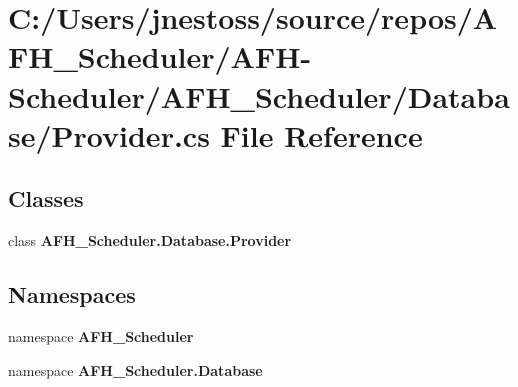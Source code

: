 \section{C\+:/\+Users/jnestoss/source/repos/\+A\+F\+H\+\_\+\+Scheduler/\+A\+F\+H-\/\+Scheduler/\+A\+F\+H\+\_\+\+Scheduler/\+Database/\+Provider.cs File Reference}
\label{_provider_8cs}
\subsection*{Classes}
\begin{DoxyCompactItemize}
\item 
class \textbf{ A\+F\+H\+\_\+\+Scheduler.\+Database.\+Provider}
\end{DoxyCompactItemize}
\subsection*{Namespaces}
\begin{DoxyCompactItemize}
\item 
namespace \textbf{ A\+F\+H\+\_\+\+Scheduler}
\item 
namespace \textbf{ A\+F\+H\+\_\+\+Scheduler.\+Database}
\end{DoxyCompactItemize}
